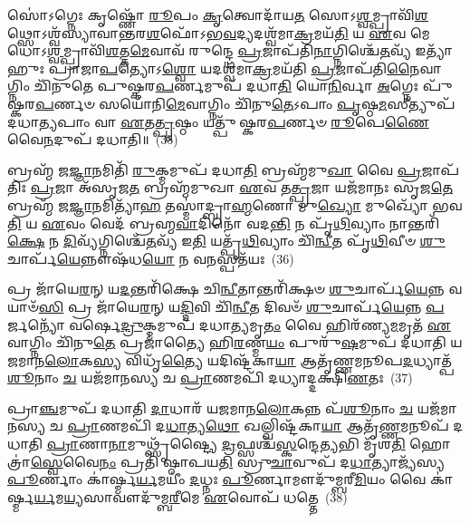 𑌸𑍋॑\-𑌽𑌗𑍍𑌨𑍇𑌃 𑌕𑍃𑌷𑍍𑌣𑍋᳴ \ul{𑌰𑍂}\-𑌪𑌂 \ul{𑌕𑍃}\-𑌤𑍍𑌵𑍋𑌦𑌾᳴𑌯\-\ul{𑌤} 𑌸𑍋\-𑌽\-\ul{𑌶𑍍𑌵}\-𑌮𑍍𑌪𑍍𑌰𑌾𑌵𑌿᳴\-\ul{𑌶}\-𑌥𑍍𑌸𑍋\-𑌽𑌶𑍍𑌵᳴𑌸𑍍𑌯𑌾𑌵𑌾𑌨𑍍𑌤𑌰\-\ul{𑌶}\-𑌫𑍋᳴\-𑌽𑌭\-\ul{𑌵}\-𑌦𑍍𑌯𑌦𑌶𑍍𑌵᳴𑌮𑌾\-\ul{𑌕𑍍𑌰}\-𑌮𑌯᳴\-\ul{𑌤𑌿} 𑌯 \ul{𑌏}\-𑌵 𑌮𑍇𑌧𑍋\-𑌽\-\ul{𑌶𑍍𑌵}\-𑌮𑍍𑌪𑍍𑌰𑌾𑌵𑌿᳴\-\ul{𑌶}\-𑌤𑍍𑌤\-\ul{𑌮𑍇}\-𑌵𑌾𑌵᳴ 𑌰𑍁𑌨𑍍𑌦𑍍𑌧𑍇 \ul{𑌪𑍍𑌰}\-𑌜𑌾𑌪᳴𑌤𑌿\-\ul{𑌨𑌾}\-𑌗𑍍𑌨𑌿𑌶𑍍𑌚𑍇᳴\-\ul{𑌤}\-𑌵𑍍𑌯᳴ 𑌇𑌤𑍍𑌯𑌾᳴𑌹𑍁𑌃 𑌪𑍍𑌰𑌾𑌜𑌾\-\ul{𑌪}\-𑌤𑍍𑌯𑍋\-𑌽\-\ul{𑌶𑍍𑌵𑍋} 𑌯𑌦𑌶𑍍𑌵᳴𑌮𑌾\-\ul{𑌕𑍍𑌰}\-𑌮𑌯᳴𑌤𑌿 \ul{𑌪𑍍𑌰}\-𑌜𑌾𑌪᳴𑌤𑌿\-\ul{𑌨𑍈}\-𑌵𑌾𑌗𑍍𑌨𑌿𑌂 𑌚𑌿᳴𑌨𑍁𑌤𑍇 𑌪𑍁𑌷𑍍𑌕𑌰\-\ul{𑌪}\-𑌰𑍍𑌣𑌮𑍁𑌪᳴ 𑌦𑌧𑌾\-\ul{𑌤𑌿} 𑌯𑍋\-\ul{𑌨𑌿}\-𑌰𑍍𑌵𑌾 \ul{𑌅}\-𑌗𑍍𑌨𑍇𑌃 𑌪𑍁᳴𑌷𑍍𑌕𑌰\-\ul{𑌪}\-𑌰𑍍𑌣𑍞 𑌸𑌯𑍋᳴𑌨𑌿\-\ul{𑌮𑍇}\-𑌵𑌾𑌗𑍍𑌨𑌿𑌂 𑌚𑌿᳴𑌨𑍁\-\ul{𑌤𑍇}\-\-𑌽𑌪𑌾𑌂 \ul{𑌪𑍃}\-𑌷𑍍𑌠\-\ul{𑌮}\-𑌸𑍀𑌤𑍍𑌯𑍁𑌪᳴ 𑌦𑌧𑌾\-\ul{𑌤𑍍𑌯}\-𑌪𑌾𑌂 𑌵𑌾 \ul{𑌏}\-𑌤\-\ul{𑌤𑍍𑌪𑍃}\-𑌷𑍍𑌠𑌂 𑌯𑌤𑍍𑌪𑍁᳴𑌷𑍍𑌕𑌰\-\ul{𑌪}\-𑌰𑍍𑌣𑍞 \ul{𑌰𑍂}\-𑌪𑍇\-\ul{𑌣𑍈}\-𑌵𑍈\-\ul{𑌨}\-𑌦𑍁𑌪᳴ 𑌦𑌧𑌾𑌤𑌿॥~(35)

{\anuvakamend[{𑌇𑌨𑍍𑌦𑍍𑌰𑌃᳴ \ul{𑌪}\-𑌶𑍁𑌕𑌾᳴𑌮𑌸𑍍𑌯 𑌭𑌵𑌤𑍍𑌯𑌵𑌿\-\ul{𑌶}\-𑌥𑍍𑌸𑌯𑍋᳴𑌨𑌿𑌂 𑌵𑌿𑍞\-\ul{𑌶}\-𑌤𑌿𑌶𑍍𑌚᳴}]}%

𑌬𑍍𑌰𑌹𑍍𑌮᳴ 𑌜\-\ul{𑌜𑍍𑌞𑌾}\-𑌨𑌮𑌿𑌤𑌿᳴ \ul{𑌰𑍁}\-𑌕𑍍𑌮𑌮𑍁𑌪᳴ 𑌦𑌧𑌾\-\ul{𑌤𑌿} 𑌬𑍍𑌰𑌹𑍍𑌮᳴𑌮𑍁\-\ul{𑌖𑌾} 𑌵𑍈 \ul{𑌪𑍍𑌰}\-𑌜𑌾𑌪᳴𑌤𑌿𑌃 \ul{𑌪𑍍𑌰}\-𑌜𑌾 𑌅᳴𑌸𑍃𑌜\-\ul{𑌤} 𑌬𑍍𑌰𑌹𑍍𑌮᳴𑌮𑍁𑌖𑌾 \ul{𑌏}\-𑌵 𑌤\-\ul{𑌤𑍍𑌪𑍍𑌰}\-𑌜𑌾 𑌯𑌜᳴𑌮𑌾𑌨𑌃 𑌸𑍃𑌜\-\ul{𑌤𑍇} 𑌬𑍍𑌰𑌹𑍍𑌮᳴ 𑌜\-\ul{𑌜𑍍𑌞𑌾}\-𑌨𑌮𑌿𑌤𑍍𑌯𑌾᳴\-\ul{𑌹} 𑌤𑌸𑍍𑌮𑌾॑𑌦𑍍𑌬𑍍𑌰𑌾\-\ul{𑌹𑍍𑌮}\-𑌣𑍋 𑌮𑍁\-\ul{𑌖𑍍𑌯𑍋} 𑌮𑍁𑌖𑍍𑌯𑍋᳴ 𑌭𑌵\-\ul{𑌤𑌿} 𑌯 \ul{𑌏}\-𑌵𑌂 𑌵𑍇𑌦᳴ 𑌬𑍍𑌰𑌹𑍍𑌮\-\ul{𑌵𑌾}\-𑌦𑌿𑌨𑍋᳴ 𑌵𑌦\-\ul{𑌨𑍍𑌤𑌿} 𑌨 𑌪𑍃᳴\-\ul{𑌥𑌿}\-𑌵𑍍𑌯𑌾𑌂 𑌨𑌾𑌨𑍍𑌤𑌰𑌿᳴\-\ul{𑌕𑍍𑌷𑍇} 𑌨 \ul{𑌦𑌿}\-𑌵𑍍𑌯᳴𑌗𑍍𑌨𑌿𑌶𑍍𑌚𑍇᳴\-\ul{𑌤}\-𑌵𑍍𑌯᳴ 𑌇\-\ul{𑌤𑌿} 𑌯𑌤𑍍𑌪𑍃᳴\-\ul{𑌥𑌿}\-𑌵𑍍𑌯𑌾𑌂 𑌚𑌿᳴\-\ul{𑌨𑍍𑌵𑍀}\-𑌤 𑌪𑍃᳴\-\ul{𑌥𑌿}\-𑌵𑍀𑍞 \ul{𑌶𑍁}\-𑌚𑌾𑌰𑍍𑌪᳴\-\ul{𑌯𑍇}\-𑌨𑍍𑌨𑍗𑌷᳴𑌧\-\ul{𑌯𑍋} 𑌨 𑌵\-\ul{𑌨}\-𑌸𑍍𑌪𑌤᳴𑌯𑌃~(36)

𑌪𑍍𑌰 𑌜𑌾᳴𑌯𑍇\-\ul{𑌰}\-𑌨𑍍 𑌯\-\ul{𑌦}\-𑌨𑍍𑌤𑌰𑌿᳴𑌕𑍍𑌷𑍇 𑌚𑌿\-\ul{𑌨𑍍𑌵𑍀}\-𑌤𑌾𑌨𑍍𑌤𑌰𑌿᳴𑌕𑍍𑌷𑍞 \ul{𑌶𑍁}\-𑌚𑌾𑌰𑍍𑌪᳴\-\ul{𑌯𑍇}\-𑌨𑍍𑌨 𑌵𑌯𑌾𑍞᳴\-\ul{𑌸𑌿} 𑌪𑍍𑌰 𑌜𑌾᳴𑌯𑍇\-\ul{𑌰}\-𑌨𑍍 𑌯\-\ul{𑌦𑍍𑌦𑌿}\-𑌵𑌿 𑌚𑌿᳴\-\ul{𑌨𑍍𑌵𑍀}\-𑌤 𑌦𑌿𑌵𑍞᳴ \ul{𑌶𑍁}\-𑌚𑌾𑌰𑍍𑌪᳴\-\ul{𑌯𑍇}\-𑌨𑍍𑌨 \ul{𑌪}\-𑌰𑍍𑌜𑌨𑍍𑌯𑍋᳴ 𑌵𑌰𑍍\mbox{}𑌷𑍇\-\ul{𑌦𑍍𑌰𑍁}\-𑌕𑍍𑌮𑌮𑍁𑌪᳴ 𑌦𑌧𑌾\-\ul{𑌤𑍍𑌯}\-𑌮𑍃\-\ul{𑌤𑌂} 𑌵𑍈 𑌹𑌿𑌰᳴𑌣𑍍𑌯\-\ul{𑌮}\-𑌮𑍃𑌤᳴ \ul{𑌏}\-𑌵𑌾𑌗𑍍𑌨𑌿𑌂 𑌚𑌿᳴𑌨𑍁\-\ul{𑌤𑍇} 𑌪𑍍𑌰𑌜𑌾॑𑌤𑍍𑌯𑍈 𑌹𑌿\-\ul{𑌰}\-𑌣𑍍𑌮\-\ul{𑌯𑌂} 𑌪𑍁𑌰𑍁᳴\-\ul{𑌷}\-𑌮𑍁𑌪᳴ 𑌦𑌧𑌾𑌤𑌿 𑌯𑌜𑌮𑌾𑌨\-\ul{𑌲𑍋}\-𑌕\-\ul{𑌸𑍍𑌯} 𑌵𑌿𑌧𑍃᳴\-\ul{𑌤𑍍𑌯𑍈} 𑌯𑌦𑌿𑌷𑍍𑌟᳴𑌕𑌾\-\ul{𑌯𑌾} 𑌆𑌤𑍃᳴𑌣𑍍𑌣𑌮𑌨𑍂𑌪\-\ul{𑌦}\-𑌧𑍍𑌯𑌾𑌤𑍍𑌪᳴\-\ul{𑌶𑍂}\-𑌨𑌾𑌂 \ul{𑌚} 𑌯𑌜᳴𑌮𑌾𑌨𑌸𑍍𑌯 𑌚 \ul{𑌪𑍍𑌰𑌾}\-𑌣𑌮𑌪𑌿᳴ 𑌦𑌧𑍍𑌯𑌾𑌦𑍍𑌦𑌕𑍍𑌷𑌿\-\ul{𑌣}\-𑌤𑌃~(37)

𑌪𑍍𑌰𑌾\-\ul{𑌞𑍍𑌚}\-𑌮𑍁𑌪᳴ 𑌦𑌧𑌾𑌤𑌿 \ul{𑌦𑌾}\-𑌧𑌾𑌰᳴ 𑌯𑌜𑌮𑌾𑌨\-\ul{𑌲𑍋}\-𑌕𑌨𑍍𑌨 𑌪᳴\-\ul{𑌶𑍂}\-𑌨𑌾𑌂 \ul{𑌚} 𑌯𑌜᳴𑌮𑌾𑌨𑌸𑍍𑌯 𑌚 \ul{𑌪𑍍𑌰𑌾}\-𑌣𑌮𑌪𑌿᳴ 𑌦\-\ul{𑌧𑌾}\-𑌤𑍍𑌯\-\ul{𑌥𑍋} 𑌖𑌲𑍍𑌵𑌿𑌷𑍍𑌟᳴𑌕𑌾\-\ul{𑌯𑌾} 𑌆𑌤𑍃᳴\-\ul{𑌣𑍍𑌣}\-𑌮𑌨𑍂𑌪᳴ 𑌦𑌧𑌾𑌤𑌿 \ul{𑌪𑍍𑌰𑌾}\-𑌣𑌾\-\ul{𑌨𑌾}\-𑌮𑍁𑌥𑍍𑌸𑍃᳴𑌷𑍍𑌟𑍍𑌯𑍈 \ul{𑌦𑍍𑌰}\-𑌫𑍍𑌸𑌶𑍍𑌚᳴\-\ul{𑌸𑍍𑌕}\-𑌨𑍍𑌦𑍇\-\ul{𑌤𑍍𑌯}\-𑌭𑌿 𑌮𑍃᳴𑌶\-\ul{𑌤𑌿} 𑌹𑍋𑌤𑍍𑌰𑌾॑\-\ul{𑌸𑍍𑌵𑍇}\-𑌵𑍈\-\ul{𑌨𑌂} 𑌪𑍍𑌰𑌤𑌿᳴ 𑌷𑍍𑌠𑌾𑌪𑌯\-\ul{𑌤𑌿} 𑌸𑍍𑌰𑍁\-\ul{𑌚𑌾}\-𑌵𑍁𑌪᳴ 𑌦\-\ul{𑌧𑌾}\-𑌤𑍍𑌯𑌾𑌜𑍍𑌯᳴𑌸𑍍𑌯 \ul{𑌪𑍂}\-𑌰𑍍𑌣𑌾𑌂 𑌕𑌾॑𑌰𑍍𑌷𑍍𑌮\-\ul{𑌰𑍍𑌯}\-𑌮𑌯𑍀𑌂॑ \ul{𑌦}\-𑌧𑍍𑌨𑌃 \ul{𑌪𑍂}\-𑌰𑍍𑌣𑌾𑌮𑍗𑌦𑍁᳴𑌮𑍍𑌬𑌰𑍀\-\ul{𑌮𑌿}\-𑌯𑌂 𑌵𑍈 𑌕𑌾॑𑌰𑍍𑌷𑍍𑌮\-\ul{𑌰𑍍𑌯}\-𑌮\-\ul{𑌯𑍍𑌯}\-𑌸𑌾𑌵𑍗𑌦𑍁᳴𑌮𑍍𑌬\-\ul{𑌰𑍀}\-𑌮𑍇 \ul{𑌏}\-𑌵𑍋𑌪᳴ 𑌧𑌤𑍍𑌤𑍇~(38)

